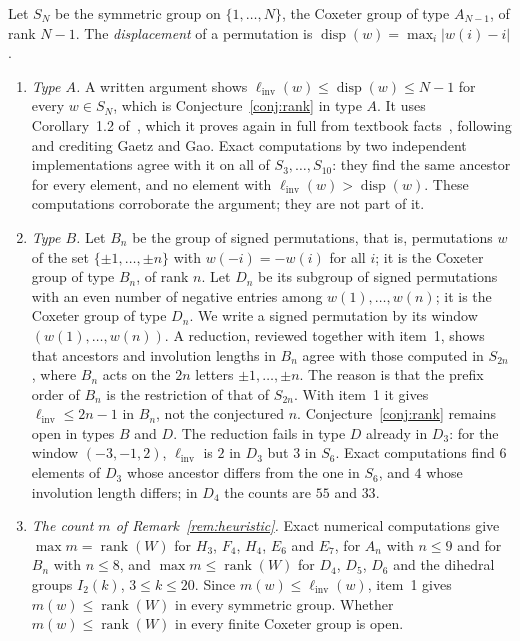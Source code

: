 \documentclass[11pt]{amsart}
\theoremstyle{definition}\newtheorem{definition}[theorem]{Definition}
\theoremstyle{remark}\newtheorem{remark}[theorem]{Remark}
\newcommand{\linv}{\ell_{\mathrm{inv}}}
\DeclareMathOperator{\rank}{rank}
\DeclareMathOperator{\disp}{disp}
\begin{document}
Let \(S_N\) be the symmetric group on \(\{1,\dots,N\}\), the Coxeter group of type \(A_{N-1}\), of rank \(N-1\). The \emph{displacement} of a permutation is \(\disp(w)=\max_i\lvert w(i)-i\rvert\).
\begin{enumerate}
\item \emph{Type \(A\).} A written argument shows \(\linv(w)\le\disp(w)\le N-1\) for every \(w\in S_N\), which is Conjecture~\ref{conj:rank} in type \(A\). It uses Corollary~1.2 of~\cite{GG}, which it proves again in full from textbook facts~\cite{BB}, following and crediting Gaetz and Gao. Exact computations by two independent implementations agree with it on all of \(S_3,\dots,S_{10}\): they find the same ancestor for every element, and no element with \(\linv(w)>\disp(w)\). These computations corroborate the argument; they are not part of it.
\item \emph{Type \(B\).} Let \(B_n\) be the group of signed permutations, that is, permutations \(w\) of the set \(\{\pm1,\dots,\pm n\}\) with \(w(-i)=-w(i)\) for all \(i\); it is the Coxeter group of type \(B_n\), of rank \(n\). Let \(D_n\) be its subgroup of signed permutations with an even number of negative entries among \(w(1),\dots,w(n)\); it is the Coxeter group of type \(D_n\). We write a signed permutation by its window \((w(1),\dots,w(n))\). A reduction, reviewed together with item~1, shows that ancestors and involution lengths in \(B_n\) agree with those computed in \(S_{2n}\), where \(B_n\) acts on the \(2n\) letters \(\pm1,\dots,\pm n\). The reason is that the prefix order of \(B_n\) is the restriction of that of \(S_{2n}\). With item~1 it gives \(\linv\le 2n-1\) in \(B_n\), not the conjectured \(n\). Conjecture~\ref{conj:rank} remains open in types \(B\) and \(D\). The reduction fails in type \(D\) already in \(D_3\): for the window \((-3,-1,2)\), \(\linv\) is \(2\) in \(D_3\) but \(3\) in \(S_6\). Exact computations find \(6\) elements of \(D_3\) whose ancestor differs from the one in \(S_6\), and \(4\) whose involution length differs; in \(D_4\) the counts are \(55\) and \(33\).
\item \emph{The count \(m\) of Remark~\ref{rem:heuristic}.} Exact numerical computations give \(\max m=\rank(W)\) for \(H_3\), \(F_4\), \(H_4\), \(E_6\) and \(E_7\), for \(A_n\) with \(n\le9\) and for \(B_n\) with \(n\le8\), and \(\max m\le\rank(W)\) for \(D_4\), \(D_5\), \(D_6\) and the dihedral groups \(I_2(k)\), \(3\le k\le20\). Since \(m(w)\le\linv(w)\), item~1 gives \(m(w)\le\rank(W)\) in every symmetric group. Whether \(m(w)\le\rank(W)\) in every finite Coxeter group is open.
\end{enumerate}
\end{document}
